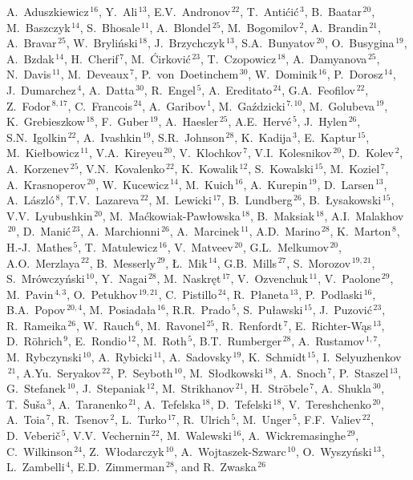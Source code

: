 
\noindent
A.~Aduszkiewicz$^{\,16}$,
Y.~Ali$^{\,13}$,
E.V.~Andronov$^{\,22}$,
T.~Anti\'ci\'c$^{\,3}$,
B.~Baatar$^{\,20}$,
M.~Baszczyk$^{\,14}$,
S.~Bhosale$^{\,11}$,
A.~Blondel$^{\,25}$,
M.~Bogomilov$^{\,2}$,
A.~Brandin$^{\,21}$,
A.~Bravar$^{\,25}$,
W.~Bryli\'nski$^{\,18}$,
J.~Brzychczyk$^{\,13}$,
S.A.~Bunyatov$^{\,20}$,
O.~Busygina$^{\,19}$,
A.~Bzdak$^{\,14}$,
H.~Cherif$^{\,7}$,
M.~\'Cirkovi\'c$^{\,23}$,
T.~Czopowicz$^{\,18}$,
A.~Damyanova$^{\,25}$,
N.~Davis$^{\,11}$,
M.~Deveaux$^{\,7}$,
P.~von~Doetinchem$^{\,30}$,
W.~Dominik$^{\,16}$,
P.~Dorosz$^{\,14}$,
J.~Dumarchez$^{\,4}$,
A.~Datta$^{\,30}$,
R.~Engel$^{\,5}$,
A.~Ereditato$^{\,24}$,
G.A.~Feofilov$^{\,22}$,
Z.~Fodor$^{\,8,17}$,
C.~Francois$^{\,24}$,
A.~Garibov$^{\,1}$,
M.~Ga\'zdzicki$^{\,7,10}$,
M.~Golubeva$^{\,19}$,
K.~Grebieszkow$^{\,18}$,
F.~Guber$^{\,19}$,
A.~Haesler$^{\,25}$,
A.E.~Herv\'e$^{\,5}$,
J.~Hylen$^{\,26}$,
S.N.~Igolkin$^{\,22}$,
A.~Ivashkin$^{\,19}$,
S.R.~Johnson$^{\,28}$,
K.~Kadija$^{\,3}$,
E.~Kaptur$^{\,15}$,
M.~Kie{\l}bowicz$^{\,11}$,
V.A.~Kireyeu$^{\,20}$,
V.~Klochkov$^{\,7}$,
V.I.~Kolesnikov$^{\,20}$,
D.~Kolev$^{\,2}$,
A.~Korzenev$^{\,25}$,
V.N.~Kovalenko$^{\,22}$,
K.~Kowalik$^{\,12}$,
S.~Kowalski$^{\,15}$,
M.~Koziel$^{\,7}$,
A.~Krasnoperov$^{\,20}$,
W.~Kucewicz$^{\,14}$,
M.~Kuich$^{\,16}$,
A.~Kurepin$^{\,19}$,
D.~Larsen$^{\,13}$,
A.~L\'aszl\'o$^{\,8}$,
T.V.~Lazareva$^{\,22}$,
M.~Lewicki$^{\,17}$,
B.~Lundberg$^{\,26}$,
B.~{\L}ysakowski$^{\,15}$,
V.V.~Lyubushkin$^{\,20}$,
M.~Ma\'ckowiak-Paw{\l}owska$^{\,18}$,
B.~Maksiak$^{\,18}$,
A.I.~Malakhov$^{\,20}$,
D.~Mani\'c$^{\,23}$,
A.~Marchionni$^{\,26}$,
A.~Marcinek$^{\,11}$,
A.D.~Marino$^{\,28}$,
K.~Marton$^{\,8}$,
H.-J.~Mathes$^{\,5}$,
T.~Matulewicz$^{\,16}$,
V.~Matveev$^{\,20}$,
G.L.~Melkumov$^{\,20}$,
A.O.~Merzlaya$^{\,22}$,
B.~Messerly$^{\,29}$,
{\L}.~Mik$^{\,14}$,
G.B.~Mills$^{\,27}$,
S.~Morozov$^{\,19,21}$,
S.~Mr\'owczy\'nski$^{\,10}$,
Y.~Nagai$^{\,28}$,
M.~Naskr\k{e}t$^{\,17}$,
V.~Ozvenchuk$^{\,11}$,
V.~Paolone$^{\,29}$,
M.~Pavin$^{\,4,3}$,
O.~Petukhov$^{\,19,21}$,
C.~Pistillo$^{\,24}$,
R.~P{\l}aneta$^{\,13}$,
P.~Podlaski$^{\,16}$,
B.A.~Popov$^{\,20,4}$,
M.~Posiada{\l}a$^{\,16}$,
R.R.~Prado$^{\,5}$,
S.~Pu{\l}awski$^{\,15}$,
J.~Puzovi\'c$^{\,23}$,
R.~Rameika$^{\,26}$,
W.~Rauch$^{\,6}$,
M.~Ravonel$^{\,25}$,
R.~Renfordt$^{\,7}$,
E.~Richter-W\k{a}s$^{\,13}$,
D.~R\"ohrich$^{\,9}$,
E.~Rondio$^{\,12}$,
M.~Roth$^{\,5}$,
B.T.~Rumberger$^{\,28}$,
A.~Rustamov$^{\,1,7}$,
M.~Rybczynski$^{\,10}$,
A.~Rybicki$^{\,11}$,
A.~Sadovsky$^{\,19}$,
K.~Schmidt$^{\,15}$,
I.~Selyuzhenkov$^{\,21}$,
A.Yu.~Seryakov$^{\,22}$,
P.~Seyboth$^{\,10}$,
M.~S{\l}odkowski$^{\,18}$,
A.~Snoch$^{\,7}$,
P.~Staszel$^{\,13}$,
G.~Stefanek$^{\,10}$,
J.~Stepaniak$^{\,12}$,
M.~Strikhanov$^{\,21}$,
H.~Str\"obele$^{\,7}$,
A.~Shukla$^{\,30}$,
T.~\v{S}u\v{s}a$^{\,3}$,
A.~Taranenko$^{\,21}$,
A.~Tefelska$^{\,18}$,
D.~Tefelski$^{\,18}$,
V.~Tereshchenko$^{\,20}$,
A.~Toia$^{\,7}$,
R.~Tsenov$^{\,2}$,
L.~Turko$^{\,17}$,
R.~Ulrich$^{\,5}$,
M.~Unger$^{\,5}$,
F.F.~Valiev$^{\,22}$,
D.~Veberi\v{c}$^{\,5}$,
V.V.~Vechernin$^{\,22}$,
M.~Walewski$^{\,16}$,
A.~Wickremasinghe$^{\,29}$,
C.~Wilkinson$^{\,24}$,
Z.~W{\l}odarczyk$^{\,10}$,
A.~Wojtaszek-Szwarc$^{\,10}$,
O.~Wyszy\'nski$^{\,13}$,
L.~Zambelli$^{\,4}$,
E.D.~Zimmerman$^{\,28}$, and
R.~Zwaska$^{\,26}$
